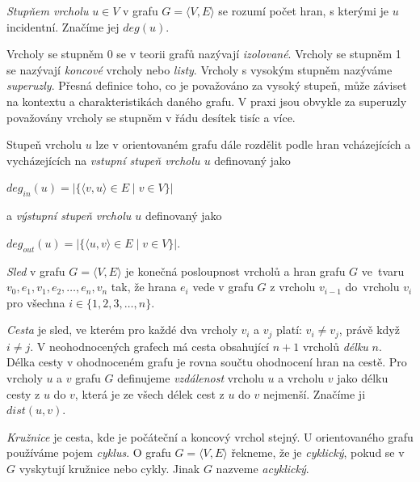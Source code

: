 \documentclass[
  program=infoi,
  biblatex=true,
  figures=true,
  glossaries=false,
  index,
  sourcecodes=true
]{kidiplom}
\begin{document}
\begin{definition}
\textit{Stupňem vrcholu} $u \in V$ v grafu $G = \langle V,E\rangle$ se rozumí počet hran, s kterými je $u$ incidentní. Značíme jej $ deg(u) $.
\end{definition}

Vrcholy se stupněm 0 se v teorii grafů nazývají \textit{izolované}. Vrcholy se stupněm 1 se nazývají \textit{koncové} vrcholy nebo \textit{listy}. Vrcholy s vysokým stupněm nazýváme \textit{superuzly}. Přesná definice toho, co je považováno za vysoký stupeň, může záviset na kontextu a charakteristikách daného grafu. V praxi jsou obvykle za superuzly považovány vrcholy se stupněm v řádu desítek tisíc a více.

Stupeň vrcholu $u$ lze v orientovaném grafu dále rozdělit podle hran vcházejících a vycházejících na \textit{vstupní stupeň vrcholu $u$} definovaný jako
\begin{center}
$ deg_{in}(u) = | \{ \langle v, u \rangle \in E \mid v \in V \} | $
\end{center}
a \textit{výstupní stupeň vrcholu $u$} definovaný jako 
\begin{center}
$ deg_{out}(u) = | \{ \langle u, v \rangle \in E \mid v \in V \} | $.
\end{center}

\begin{definition}[Sled]
\textit{Sled} v grafu $G = \langle V,E\rangle$ je konečná posloupnost vrcholů a hran grafu $G$ ve~tvaru $ v_0, e_1, v_1, e_2, \ldots  ,e_n , v_n $ tak, že hrana $ e_i$ vede v grafu $G$ z vrcholu $v_{i-1}$ do~vrcholu $v_i$ pro všechna $ i \in \{ 1, 2, 3, \ldots ,n \} $.
\end{definition}

\textit{Cesta} je sled, ve kterém pro každé dva vrcholy $v_i$ a $v_j$ platí: $v_i \neq v_j$, právě když $i \neq j$. V neohodnocených grafech má cesta obsahující $n+1$ vrcholů \textit{délku} $n$. Délka cesty v ohodnoceném grafu je rovna součtu ohodnocení hran na cestě. Pro vrcholy $u$ a $v$ grafu $G$ definujeme \textit{vzdálenost} vrcholu $u$ a vrcholu $v$ jako délku cesty z $u$ do $v$, která je ze všech délek cest z $u$ do $v$ nejmenší. Značíme ji $dist(u,v)$.

\textit{Kružnice} je cesta, kde je počáteční a koncový vrchol stejný. U orientovaného grafu používáme pojem \textit{cyklus}. O grafu $G = \langle V,E\rangle$ řekneme, že je \textit{cyklický}, pokud se v $G$ vyskytují kružnice nebo cykly. Jinak $G$ nazveme \textit{acyklický}.
\end{document}
